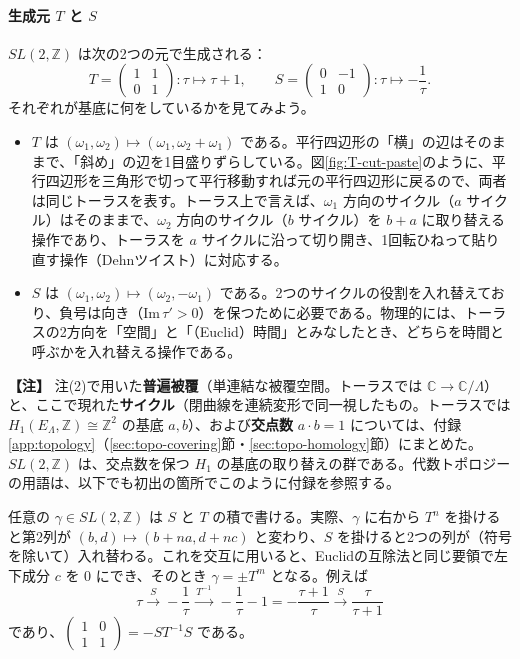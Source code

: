 \documentclass[uplatex, dvipdfmx, book]{jsbook}
\newenvironment{note}{\vspace{1ex}\par\footnotesize\noindent\textbf{【注】}}{\par\vspace{1ex}}
\begin{document}
\paragraph{生成元 $T$ と $S$}
$SL(2,\mathbb{Z})$ は次の2つの元で生成される：
\begin{equation*}
    T = \begin{pmatrix} 1 & 1 \\ 0 & 1 \end{pmatrix} : \tau \mapsto \tau + 1, \qquad
    S = \begin{pmatrix} 0 & -1 \\ 1 & 0 \end{pmatrix} : \tau \mapsto -\frac{1}{\tau}.
\end{equation*}
それぞれが基底に何をしているかを見てみよう。
\begin{itemize}
    \item $T$ は $(\omega_1, \omega_2) \mapsto (\omega_1, \omega_2 + \omega_1)$ である。平行四辺形の「横」の辺はそのままで、「斜め」の辺を1目盛りずらしている。図\ref{fig:T-cut-paste}のように、平行四辺形を三角形で切って平行移動すれば元の平行四辺形に戻るので、両者は同じトーラスを表す。トーラス上で言えば、$\omega_1$ 方向のサイクル（$a$ サイクル）はそのままで、$\omega_2$ 方向のサイクル（$b$ サイクル）を $b + a$ に取り替える操作であり、トーラスを $a$ サイクルに沿って切り開き、1回転ひねって貼り直す操作（Dehnツイスト）に対応する。
    \item $S$ は $(\omega_1, \omega_2) \mapsto (\omega_2, -\omega_1)$ である。2つのサイクルの役割を入れ替えており、負号は向き（$\mathrm{Im}\,\tau' > 0$）を保つために必要である。物理的には、トーラスの2方向を「空間」と「（Euclid）時間」とみなしたとき、どちらを時間と呼ぶかを入れ替える操作である。
\end{itemize}

\begin{note}
注(2)で用いた\textbf{普遍被覆}（単連結な被覆空間。トーラスでは $\mathbb{C} \to \mathbb{C}/\Lambda$）と、ここで現れた\textbf{サイクル}（閉曲線を連続変形で同一視したもの。トーラスでは $H_1(E_\Lambda, \mathbb{Z}) \cong \mathbb{Z}^2$ の基底 $a, b$）、および\textbf{交点数} $a \cdot b = 1$ については、付録\ref{app:topology}（\ref{sec:topo-covering}節・\ref{sec:topo-homology}節）にまとめた。$SL(2, \mathbb{Z})$ は、交点数を保つ $H_1$ の基底の取り替えの群である。代数トポロジーの用語は、以下でも初出の箇所でこのように付録を参照する。
\end{note}
任意の $\gamma \in SL(2,\mathbb{Z})$ は $S$ と $T$ の積で書ける。実際、$\gamma$ に右から $T^n$ を掛けると第2列が $(b, d) \mapsto (b + na, d + nc)$ と変わり、$S$ を掛けると2つの列が（符号を除いて）入れ替わる。これを交互に用いると、Euclidの互除法と同じ要領で左下成分 $c$ を $0$ にでき、そのとき $\gamma = \pm T^m$ となる。例えば
\begin{equation*}
    \tau \xrightarrow{\ S\ } -\frac{1}{\tau} \xrightarrow{\ T^{-1}\ } -\frac{1}{\tau} - 1 = -\frac{\tau + 1}{\tau} \xrightarrow{\ S\ } \frac{\tau}{\tau + 1}
\end{equation*}
であり、$\begin{pmatrix} 1 & 0 \\ 1 & 1 \end{pmatrix} = -ST^{-1}S$ である。
\end{document}
